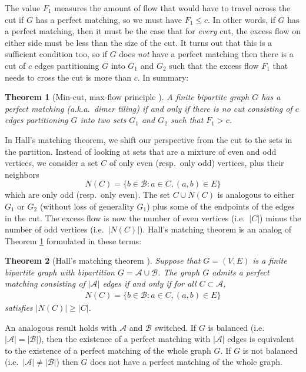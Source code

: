\documentclass[11pt]{article}
\newtheorem{thm}{Theorem}[subsection]
\theoremstyle{remark}
\theoremstyle{definition}
\newcommand{\mc}[1]{\mathcal{#1}}
\newcommand{\symindex}[1]{\index{{\textbf{Symbols}}!#1}}
\begin{document}
The value $F_1$ measures the amount of flow that would have to travel across the cut if $G$ has a perfect matching, so we must have $F_1 \leq c$. In other words, if $G$ has a perfect matching, then it must be the case that for \textit{every} cut, the excess flow on either side must be less than the size of the cut. It turns out that this is a sufficient condition too, so if $G$ does \textit{not} have a perfect matching then there is a cut of $c$ edges partitioning $G$ into $G_1$ and $G_2$ such that the excess flow $F_1$ that needs to cross the cut is more than $c$. In summary:

\begin{thm}[Min-cut, max-flow principle \cite{ford_fulkerson_1956}]\label{mincut}
A finite bipartite graph $G$ has a perfect matching (a.k.a.\ dimer tiling) if and only if there is no cut consisting of $c$ edges partitioning $G$ into two sets $G_1$ and $G_2$ such that $F_1 > c$. 
\end{thm}

In Hall's matching theorem, we shift our perspective from the cut to the sets in the partition. Instead of looking at sets that are a mixture of even and odd vertices, we consider a set $C$ of only even (resp.\ only odd) vertices, plus their neighbors 
$$N(C) = \{ b\in \mc B :  a\in C, (a,b) \in E\}$$
which are only odd (resp.\ only even). The set $C \cup N(C)$ is analogous to either $G_1$ or $G_2$ (without loss of generality $G_1$) plus some of the endpoints of the edges in the cut. The excess flow is now the number of even vertices (i.e.\ $|C|$) minus the number of odd vertices (i.e.\ $|N(C)|$).\symindex{Chapter 6!set $C$, its neighbors $N(C)$}  Hall's matching theorem is an analog of Theorem \ref{mincut} formulated in these terms:
\begin{thm}[Hall's matching theorem \cite{hallmarriage}]\label{thm:halls matching}
Suppose that $G = (V,E)$ is a finite bipartite graph with bipartition $G = \mc A\cup \mc B$. The graph $G$ admits a perfect matching consisting of $|\mc A|$ edges if and only if for all $C \subset \mc A$, 
\begin{align*}
    N(C) = \{ b\in \mc B : a\in C, (a,b) \in E\}
\end{align*}
satisfies $|N(C)| \geq |C|$.
\end{thm}
An analogous result holds with $\mc A$ and $\mc B$ switched. If $G$ is balanced (i.e.\ $|\mc A| = |\mc B|$), then the existence of a perfect matching with $|\mc A|$ edges is equivalent to the existence of a perfect matching of the whole graph $G$. If $G$ is not balanced (i.e.\ $|\mc A|\neq |\mc B|$) then $G$ does not have a perfect matching of the whole graph.
\end{document}
